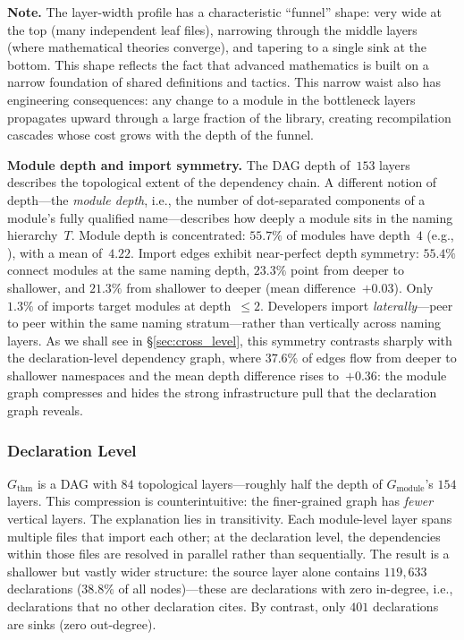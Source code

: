 \noindent\textbf{Note.}
The layer-width profile has a characteristic ``funnel'' shape: very wide at the top (many independent leaf files), narrowing through the middle layers (where mathematical theories converge), and tapering to a single sink at the bottom. This shape reflects the fact that advanced mathematics is built on a narrow foundation of shared definitions and tactics. This narrow waist also has engineering consequences: any change to a module in the bottleneck layers propagates upward through a large fraction of the library, creating recompilation cascades whose cost grows with the depth of the funnel.

\noindent\textbf{Module depth and import symmetry.}
\label{rem:import-depth-symmetry}
The DAG depth of~$153$ layers describes the topological extent of the dependency chain. A different notion of depth---the \emph{module depth}, i.e., the number of dot-separated components of a module's fully qualified name---describes how deeply a module sits in the naming hierarchy~$T$. Module depth is concentrated: $55.7\%$ of modules have depth~$4$ (e.g., ), with a mean of~$4.22$. Import edges exhibit near-perfect depth symmetry: $55.4\%$ connect modules at the same naming depth, $23.3\%$ point from deeper to shallower, and $21.3\%$ from shallower to deeper (mean difference~$+0.03$). Only~$1.3\%$ of imports target modules at depth~$\le 2$. Developers import \emph{laterally}---peer to peer within the same naming stratum---rather than vertically across naming layers. As we shall see in \S\ref{sec:cross_level}, this symmetry contrasts sharply with the declaration-level dependency graph, where $37.6\%$ of edges flow from deeper to shallower namespaces and the mean depth difference rises to~$+0.36$: the module graph compresses and hides the strong infrastructure pull that the declaration graph reveals.

\subsubsection{Declaration Level}
\label{sec:thm-dag-depth}

$G_{\mathrm{thm}}$ is a DAG with $84$ topological layers---roughly half the depth of $G_{\mathrm{module}}$'s $154$ layers. This compression is counterintuitive: the finer-grained graph has \emph{fewer} vertical layers. The explanation lies in transitivity. Each module-level layer spans multiple files that import each other; at the declaration level, the dependencies within those files are resolved in parallel rather than sequentially. The result is a shallower but vastly wider structure: the source layer alone contains $119{,}633$ declarations ($38.8\%$ of all nodes)---these are declarations with zero in-degree, i.e., declarations that no other declaration cites. By contrast, only $401$ declarations are sinks (zero out-degree).

